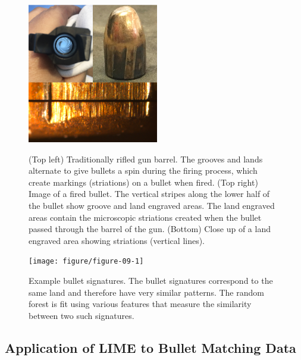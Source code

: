 \documentclass[AMS,STIX2COL]{WileyNJD-v2}\usepackage[]{graphicx}\usepackage[]{color}
\newenvironment{knitrout}{}{} %
\begin{document}
\begin{figure}[!t]
\centering
\begin{knitrout}
\color{fgcolor}

{\centering \includegraphics[width=2.25in]{figure-static/figure-08-1} 

}



\end{knitrout}
\caption{(Top left) Traditionally rifled gun barrel. The grooves and lands alternate to give bullets a spin during the firing process, which create markings (striations) on a bullet when fired. (Top right) Image of a fired bullet. The vertical stripes along the lower half of the bullet show groove and land engraved areas. The land engraved areas contain the microscopic striations created when the bullet passed through the barrel of the gun. (Bottom) Close up of a land engraved area showing striations (vertical lines).}
\label{fig:figure-08}

\vspace*{\floatsep}

\begin{knitrout}
\color{fgcolor}

{\centering \texttt{[image: figure/figure-09-1]} 

}



\end{knitrout}
\caption{Example bullet signatures. The bullet signatures correspond to the same land and therefore have very similar patterns. The \citet{hare:2016} random forest is fit using various features that measure the similarity between two such signatures.}
\label{fig:figure-09}
\end{figure}

\subsection{Application of LIME to Bullet Matching Data}
\end{document}
